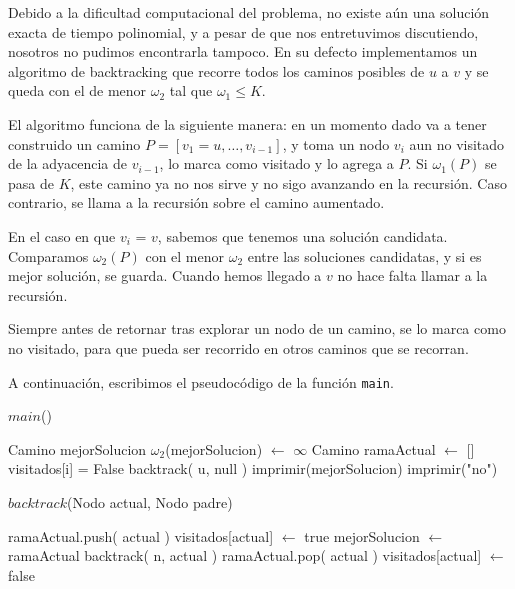 Debido a la dificultad computacional del problema, no existe a\'un una soluci\'on exacta de tiempo polinomial, y a pesar de que nos entretuvimos
discutiendo, nosotros no pudimos encontrarla tampoco. En su defecto implementamos un algoritmo de backtracking que recorre todos los caminos
posibles de $u$ a $v$ y se queda con el de menor $\omega_2$ tal que $\omega_1 \leq K$. 

El algoritmo funciona de la siguiente manera: en un momento dado va a tener construido un camino $P = [v_1 = u, \dots, v_{i-1}]$, y toma un nodo
$v_i$ aun no visitado de la adyacencia de $v_{i-1}$, lo marca como visitado y lo agrega a $P$. Si $\omega_1(P)$ se pasa de $K$, este camino ya no
nos sirve y no sigo avanzando en la recursión. Caso contrario, se llama a la recursión sobre el camino aumentado.

En el caso en que $v_i$ = $v$, sabemos que tenemos una solución candidata. Comparamos $\omega_2(P)$ con el menor $\omega_2$ entre las soluciones
candidatas, y si es mejor solución, se guarda. Cuando hemos llegado a $v$ no hace falta llamar a la recursión.

Siempre antes de retornar tras explorar un nodo de un camino, se lo marca como no visitado, para que pueda ser recorrido en otros caminos que se
recorran.

A continuaci\'on, escribimos el pseudoc\'odigo de la funci\'on \texttt{main}.
\begin{algorithm}[H]
\caption{$main$()}
\begin{algorithmic}[1]
  \State Camino mejorSolucion
  \State $\omega_2$(mejorSolucion) $\leftarrow$ $\infty$
  \State Camino ramaActual $\leftarrow$ []
    \State visitados[i] = False
  \EndFor
  \State backtrack( u, null )
    \State imprimir(mejorSolucion)
  \Else{}
    \State imprimir("no")
  \EndIf
\end{algorithmic}
\end{algorithm}

\begin{algorithm}[H]
\caption{$backtrack$(Nodo actual, Nodo padre)}
\begin{algorithmic}[1]
  \State ramaActual.push( actual )
  \State visitados[actual] $\leftarrow$ true
      \State mejorSolucion $\leftarrow$ ramaActual
	  \State backtrack( n, actual )
	\EndIf
      \EndFor
    \EndIf
  \EndIf
  \State ramaActual.pop( actual )
  \State visitados[actual] $\leftarrow$ false
\end{algorithmic}
\end{algorithm}

